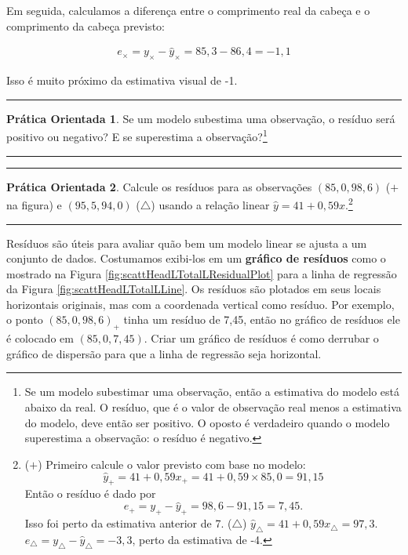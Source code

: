 \documentclass[
]{book}
\theoremstyle{definition}
\theoremstyle{definition}
\theoremstyle{definition}
\newtheorem{exercise}{Prática Orientada}[chapter]
\theoremstyle{definition}
\theoremstyle{remark}
\begin{document}
Em seguida, calculamos a diferença entre o comprimento real da cabeça e o comprimento da cabeça previsto:

\begin{eqnarray*}
e_{\times} = y_{\times} - \hat{y}_{\times} = 85,3 -  86,4 = -1,1
\end{eqnarray*}

Isso é muito próximo da estimativa visual de -1.

\begin{center}\rule{0.5\linewidth}{0.5pt}\end{center}

\begin{exercise}
\protect\hypertarget{exr:unnamed-chunk-268}{}{\label{exr:unnamed-chunk-268} }Se um modelo subestima uma observação, o resíduo será positivo ou negativo? E se superestima a observação?\footnote{Se um modelo subestimar uma observação, então a estimativa do modelo está abaixo da real. O resíduo, que é o valor de observação real menos a estimativa do modelo, deve então ser positivo. O oposto é verdadeiro quando o modelo superestima a observação: o resíduo é negativo.}
\end{exercise}

\begin{center}\rule{0.5\linewidth}{0.5pt}\end{center}

\begin{center}\rule{0.5\linewidth}{0.5pt}\end{center}

\begin{exercise}
\protect\hypertarget{exr:unnamed-chunk-269}{}{\label{exr:unnamed-chunk-269} }Calcule os resíduos para as observações \((85,0, 98,6)\) (\(+\) na figura) e \((95,5, 94,0)\) (\(\triangle\)) usando a relação linear \(\hat{y} = 41 + 0,59x\).\footnote{(\(+\)) Primeiro calcule o valor previsto com base no modelo: \[\hat{y}_{+} = 41+0,59x_{+} = 41+0,59\times 85,0 = 91,15\] Então o resíduo é dado por \[e_{+} = y_{+} - \hat{y}_{+} = 98,6-91,15=7,45.\] Isso foi perto da estimativa anterior de 7. (\(\triangle\)) \(\hat{y}_{\triangle} = 41+0,59x_{\triangle} = 97,3\). \(e_{\triangle} = y_{\triangle} - \hat{y}_{\triangle} = -3,3\), perto da estimativa de -4.}
\end{exercise}

\begin{center}\rule{0.5\linewidth}{0.5pt}\end{center}

Resíduos são úteis para avaliar quão bem um modelo linear se ajusta a um conjunto de dados. Costumamos exibi-los em um \textbf{gráfico de resíduos} como o mostrado na Figura \ref{fig:scattHeadLTotalLResidualPlot} para a linha de regressão da Figura \ref{fig:scattHeadLTotalLLine}. Os resíduos são plotados em seus locais horizontais originais, mas com a coordenada vertical como resíduo. Por exemplo, o ponto \((85,0,98,6)_{+}\) tinha um resíduo de 7,45, então no gráfico de resíduos ele é colocado em \((85,0, 7,45)\). Criar um gráfico de resíduos é como derrubar o gráfico de dispersão para que a linha de regressão seja horizontal.
\end{document}
